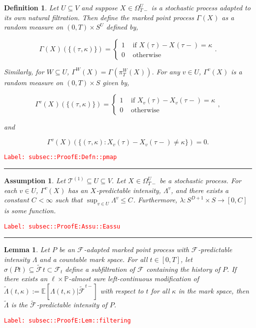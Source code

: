 \documentclass[12pt]{article}
\newcommand{\mb}{\mathbb}
\newcommand{\mc}{\mathcal}
\newcommand{\ra}{\rightarrow}
\newcommand{\te}{\text}
\newcommand{\tr}{\textcolor{red}}
\newcommand{\labe}[1]{\tr{\texttt{Label: #1}}}
\newcommand{\lin}{\rule{\linewidth}{0.4 pt}}
\newcommand{\pr}{\mb{P}}							%
\newcommand{\ex}[1]{\mb{E}\left[#1\right]}			%
\renewcommand{\v}{v}							%
\renewcommand{\U}{U}							%
\newcommand{\UU}{W}								%
\renewcommand{\S}{S}							%
\newcommand{\T}{T}								%
\renewcommand{\t}{t}							%
\newcommand{\sset}{\Omega}						%
\newcommand{\proj}{\pi}							%
\newcommand{\F}{\mc{F}}							%
\newcommand{\X}{X}								%
\newcommand{\vind}[1]{^{#1}}					%
\newcommand{\carp}[1]{^{#1}}					%
\newcommand{\vsi}[1]{^{#1}}						%
\newcommand{\cind}[1]{_{#1}}					%
\newcommand{\tp}[1]{(#1)}						%
\newcommand{\tip}[1]{#1}						%
\newcommand{\ts}[1]{_{#1}}						%
\newcommand{\const}{C}							%
\newcommand{\degr}{D}							%
\newcommand{\tree}{\mc{T}}						%
\newcommand{\sln}[1]{^{(#1)}}					%
\newcommand{\Sm}{\ell}							%
\newcommand{\alt}[1]{\widetilde{#1}}			%
\newcommand{\indx}[1]{_{#1}}					%
\newcommand{\rt}{\tau}							%
\newcommand{\pmap}{\Gamma}						%
\renewcommand{\mark}{\kappa}					%
\newcommand{\rp}{P}								%
\newcommand{\ratee}{\Lambda}					%
\newcommand{\cratee}{\alt{\Lambda}} 			%
\newtheorem{lem}[thms]{Lemma}
\newtheorem{defn}[thms]{Definition}
\newtheorem{assu}[thms]{Assumption}
\begin{document}
\begin{defn}
Let \(\U\subseteq V\) and suppose \(\X\cind{}\tip{} \in \sset\vsi{\U}\ts{\T-}\) is a stochastic process adapted to its own natural filtration. Then define the marked point process \(\pmap\vind{}(\X\cind{}\tip{})\) as a random measure on \((0,\T) \times \S\carp{\U}\) defined by,

\[\pmap\vind{}(\X\cind{}\tip{})(\{(\rt\indx{},\mark{})\}) = \begin{cases}
1 &\te{ if } \X\cind{}\tp{\rt\indx{}} - \X\cind{}\tp{\rt\indx{}-} = \mark{}\\
0 &\te{ otherwise}
\end{cases}.\]

Similarly, for \(\UU \subseteq \U\), \(\pmap\vind{\UU}(\X\cind{}\tip{}) = \pmap\vind{}\left(\proj\vsi{\UU}\ts{\T}(\X\cind{}\tip{})\right)\). For any \(\v\in \U\), \(\pmap\vind{\v}(\X\cind{}\tip{})\) is a random measure on \((0,\T) \times \S\) given by,

\[\pmap\vind{\v}(\X\cind{}\tip{})(\{(\rt\indx{},\mark{})\}) = \begin{cases}
1 &\te{ if } \X\cind{\v}\tp{\rt\indx{}} - \X\cind{\v}\tp{\rt\indx{}-} = \mark{}\\
0 &\te{ otherwise}
\end{cases},\]

and

\[\pmap\vind{\v}(\X\cind{}\tip{})(\{(\rt\indx{},\mark{}): \X\cind{\v}\tp{\rt\indx{}} - \X\cind{\v}\tp{\rt\indx{}-} \neq \mark{}\}) = 0.\]
\label{subsec::ProofE:Defn::pmap}
\end{defn}
\labe{subsec::ProofE:Defn::pmap}

\lin

\begin{assu}
Let \(\tree\sln{1}\subseteq\U \subseteq V\). Let \(\X\cind{}\tip{}\in \sset\vsi{\U}\ts{\T-}\) be a stochastic process. For each \(\v\in \U\), \(\pmap\vind{\v}(\X\cind{}\tip{})\) has an \(\X\cind{}\tip{}\)-predictable intensity, \(\ratee\vind{\v}\), and there exists a constant \(\const\indx{} < \infty\) such that \(\sup_{\v\in\U} \ratee\vind{\v} \leq \const\indx{}\). Furthermore, \(\lambda: \S\carp{\degr+1}\times \S\ra[0,\const\indx{}]\) is some function.
\label{subsec::ProofE:Assu::Eassu}
\end{assu}
\labe{subsec::ProofE:Assu::Eassu}

\lin

\begin{lem}
Let \(\rp{}\) be an \(\F\vsi{}\ts{}\)-adapted marked point process with \(\F\vsi{}\ts{}\)-predictable intensity \(\ratee\) and a countable mark space. For all \(\t \in [0,\T]\), let \(\sigma(\rp{\t}) \subseteq \alt{\F\ts{}}{\t}\subset \F\vsi{}\ts{\t}\) define a subfiltration of \(\F\vsi{}\ts{}\) containing the history of \(\rp{}\). If there exists an \(\Sm\times \pr\)-almost sure left-continuous modification of \(\cratee{}{}(\t,\mark{}) := \ex{\ratee(\t,\mark{})|\alt{\F\vsi{}\ts{}}^{\t-}}\) with respect to \(\t\) for all \(\mark{}\) in the mark space, then \(\cratee{}{}\) is the \(\alt{\F\vsi{}\ts{}}\)-predictable intensity of \(\rp{}\).
\label{subsec::ProofE:Lem::filtering}
\end{lem}
\labe{subsec::ProofE:Lem::filtering}
\end{document}
